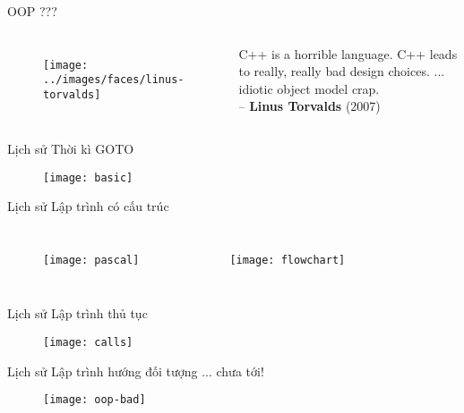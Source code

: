 \documentclass{beamer}
\begin{document}
\begin{frame}{OOP ???}
    \begin{columns}
        \begin{figure}
            \centering
            \texttt{[image: ../images/faces/linus-torvalds]}
        \end{figure}
        C++ is a horrible language. C++ leads to really, really bad
        design choices. ... idiotic object model crap.\\
        -- \textbf{Linus Torvalds} (2007)
    \end{columns}
\end{frame}

\begin{frame}{Lịch sử}
    \Large Thời kì GOTO
    \begin{figure}
        \centering
        \texttt{[image: basic]}
    \end{figure}
\end{frame}

\begin{frame}{Lịch sử}
    \Large Lập trình có cấu trúc
    \begin{columns}
        \begin{figure}
            \centering
            \texttt{[image: pascal]}
        \end{figure}
        \begin{figure}
            \centering
            \texttt{[image: flowchart]}
        \end{figure}
    \end{columns}
\end{frame}

\begin{frame}{Lịch sử}
    \Large Lập trình thủ tục
    \begin{figure}
        \centering
        \texttt{[image: calls]}
    \end{figure}
\end{frame}

\begin{frame}{Lịch sử}
    \Large Lập trình hướng đối tượng ... chưa tới!
    \begin{figure}
        \centering
        \texttt{[image: oop-bad]}
    \end{figure}
\end{frame}
\end{document}
